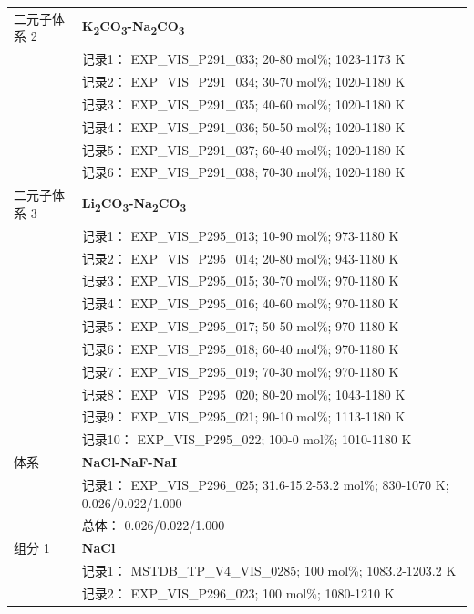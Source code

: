 \documentclass[12pt]{article}
\begin{document}
{\begin{longtable}[]{@{}
  >{\raggedright\arraybackslash}p{}
  >{\raggedright\arraybackslash}p{}@{}}
二元子体系 2  & \textbf{K\textsubscript{2}CO\textsubscript{3}-Na\textsubscript{2}CO\textsubscript{3}} \\
 & 记录1： EXP\_VIS\_P291\_033; 20-80 mol\%; 1023-1173 K \\
 & 记录2： EXP\_VIS\_P291\_034; 30-70 mol\%; 1020-1180 K \\
 & 记录3： EXP\_VIS\_P291\_035; 40-60 mol\%; 1020-1180 K \\
 & 记录4： EXP\_VIS\_P291\_036; 50-50 mol\%; 1020-1180 K \\
 & 记录5： EXP\_VIS\_P291\_037; 60-40 mol\%; 1020-1180 K \\
 & 记录6： EXP\_VIS\_P291\_038; 70-30 mol\%; 1020-1180 K  \\

二元子体系 3  & \textbf{Li\textsubscript{2}CO\textsubscript{3}-Na\textsubscript{2}CO\textsubscript{3}} \\
 & 记录1： EXP\_VIS\_P295\_013; 10-90 mol\%; 973-1180 K \\
 & 记录2： EXP\_VIS\_P295\_014; 20-80 mol\%; 943-1180 K \\
 & 记录3： EXP\_VIS\_P295\_015; 30-70 mol\%; 970-1180 K \\
 & 记录4： EXP\_VIS\_P295\_016; 40-60 mol\%; 970-1180 K \\
 & 记录5： EXP\_VIS\_P295\_017; 50-50 mol\%; 970-1180 K \\
 & 记录6： EXP\_VIS\_P295\_018; 60-40 mol\%; 970-1180 K \\
 & 记录7： EXP\_VIS\_P295\_019; 70-30 mol\%; 970-1180 K \\
 & 记录8： EXP\_VIS\_P295\_020; 80-20 mol\%; 1043-1180 K \\
 & 记录9： EXP\_VIS\_P295\_021; 90-10 mol\%; 1113-1180 K \\
 & 记录10： EXP\_VIS\_P295\_022; 100-0 mol\%; 1010-1180 K  \\

\midrule
体系 & \textbf{NaCl-NaF-NaI} \\
 & 记录1： EXP\_VIS\_P296\_025; 31.6-15.2-53.2 mol\%; 830-1070 K; 0.026/0.022/1.000 \\
 & 总体： 0.026/0.022/1.000  \\

组分 1  & \textbf{NaCl} \\
 & 记录1： MSTDB\_TP\_V4\_VIS\_0285; 100 mol\%; 1083.2-1203.2 K \\
 & 记录2： EXP\_VIS\_P296\_023; 100 mol\%; 1080-1210 K  \\


\end{longtable}}
\end{document}
